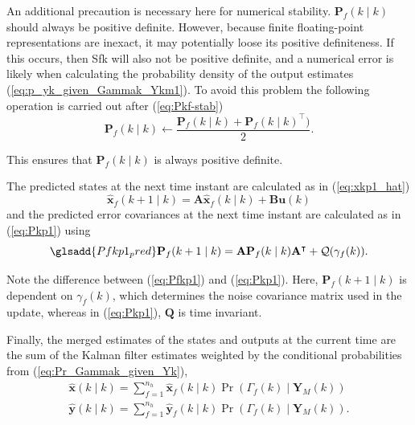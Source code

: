 An additional precaution is necessary here for numerical stability. $\mathbf{P}_f(k \mid k)$ should always be positive definite. However, because finite floating-point representations are inexact, it may potentially loose its positive definiteness. If this occurs, then \gls{Sfk} will also not be positive definite, and a numerical error is likely when calculating the probability density of the output estimates (\ref{eq:p_yk_given_Gammak_Ykm1}). To avoid this problem the following operation is carried out after (\ref{eq:Pkf-stab})
\begin{equation} \label{eq:Pkf-psd-fix}
	\mathbf{P}_f(k \mid k) \gets \frac{ \mathbf{P}_f(k \mid k) + \mathbf{P}_f(k \mid k)^\intercal )}{2}. 
\end{equation}

This ensures that $\mathbf{P}_f(k \mid k)$ is always positive definite.

The predicted states at the next time instant are calculated as in (\ref{eq:xkp1_hat})
\begin{equation} \label{eq:xfkp1_hat}
	\mathbf{\hat{x}}_f(k+1 \mid k) = \mathbf{A} \mathbf{\hat{x}}_f(k \mid k) + \mathbf{B} \mathbf{u}(k)
\end{equation}
and the predicted error covariances at the next time instant are calculated as in (\ref{eq:Pkp1}) using
\begin{equation} \label{eq:Pfkp1} \glsadd{Pfkp1_pred}
	\mathbf{P}_f(k+1 \mid k) = \mathbf{A} \mathbf{P}_f(k \mid k)  \mathbf{A}^\intercal  + \mathcal{Q}(\gamma_f(k)).
\end{equation}

Note the difference between (\ref{eq:Pfkp1}) and (\ref{eq:Pkp1}).  Here, $\mathbf{P}_f(k+1 \mid k)$ is dependent on $\gamma_f(k)$, which determines the noise covariance matrix used in the update, whereas in (\ref{eq:Pkp1}), $\mathbf{Q}$ is time invariant.

Finally, the merged estimates of the states and outputs at the current time are the sum of the Kalman filter estimates weighted by the conditional probabilities from (\ref{eq:Pr_Gammak_given_Yk}),
\begin{equation} \label{eq:xkyk_hat_MKF}
	\begin{aligned}
		\mathbf{\hat{x}}(k \mid k) = \sum_{f=1}^{n_h} \mathbf{\hat{x}}_f(k \mid k) \Pr(\Gamma_f(k) \mid \mathbf{Y}_M(k)) \\
		\mathbf{\hat{y}}(k \mid k) = \sum_{f=1}^{n_h} \mathbf{\hat{y}}_f(k \mid k) \Pr(\Gamma_f(k) \mid \mathbf{Y}_M(k)).
	\end{aligned}
\end{equation}

